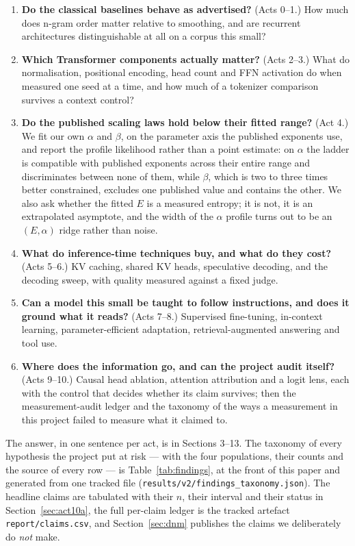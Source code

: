 \documentclass[11pt,a4paper]{article}
\begin{document}
\begin{enumerate}
\item \textbf{Do the classical baselines behave as advertised?} (Acts 0--1.)
      How much does n-gram order matter relative to smoothing, and are
      recurrent architectures distinguishable at all on a corpus this small?
\item \textbf{Which Transformer components actually matter?} (Acts 2--3.)
      What do normalisation, positional encoding, head count and FFN activation
      do when measured one seed at a time, and how much of a tokenizer
      comparison survives a context control?
\item \textbf{Do the published scaling laws hold below their fitted range?}
      (Act 4.) We fit our own $\alpha$ and $\beta$, on the parameter axis the
      published exponents use, and report the profile likelihood rather than a
      point estimate: on $\alpha$ the ladder is compatible with published
      exponents across their entire range and discriminates between none of
      them, while $\beta$, which is two to three times better constrained,
      excludes one published value and contains the other. We also ask whether
      the fitted $E$ is a measured entropy; it is not, it is an extrapolated
      asymptote, and the width of the $\alpha$ profile turns out to be an
      $(E, \alpha)$ ridge rather than noise.
\item \textbf{What do inference-time techniques buy, and what do they cost?}
      (Acts 5--6.) KV caching, shared KV heads, speculative decoding, and the
      decoding sweep, with quality measured against a fixed judge.
\item \textbf{Can a model this small be taught to follow instructions, and does
      it ground what it reads?} (Acts 7--8.) Supervised fine-tuning,
      in-context learning, parameter-efficient adaptation, retrieval-augmented
      answering and tool use.
\item \textbf{Where does the information go, and can the project audit
      itself?} (Acts 9--10.) Causal head ablation, attention attribution and
      a logit lens, each with the control that decides whether its claim
      survives; then the measurement-audit ledger and the taxonomy of the ways
      a measurement in this project failed to measure what it claimed to.
\end{enumerate}

The answer, in one sentence per act, is in Sections 3--13. The taxonomy of
every hypothesis the project put at risk --- with the four populations, their
counts and the source of every row --- is Table~\ref{tab:findings}, at the front
of this paper and generated from one tracked file
(\texttt{results/v2/findings\_taxonomy.json}). The headline claims are
tabulated with their $n$, their interval and their status in
Section~\ref{sec:act10a}, the full per-claim ledger is the tracked artefact
\texttt{report/claims.csv}, and Section~\ref{sec:dnm} publishes the claims we
deliberately do \emph{not} make.
\end{document}
